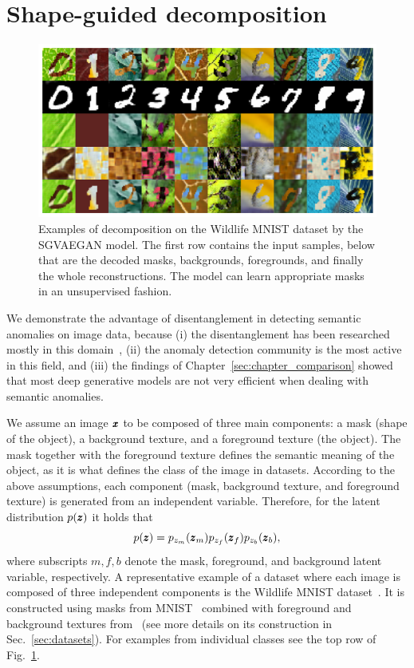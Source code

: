 \section{Shape-guided decomposition} \label{sec:model}
\begin{figure}[ht!]
    \centering
    \includegraphics[width=\textwidth]{data/chapter_sgvaegan/fig1_wmnist_grid.png}
    \caption{Examples of decomposition on the Wildlife MNIST dataset by the SGVAEGAN model. The first row contains the input samples, below that are the decoded masks, backgrounds, foregrounds, and finally the whole reconstructions. The model can learn appropriate masks in an unsupervised fashion.}
    \label{fig:wmnist_grid}
\end{figure}

We demonstrate the advantage of disentanglement in detecting semantic anomalies on image data, because (i) the disentanglement has been researched mostly in this domain~\cite{kim2018disentangling, kim2019bayes, choi2020discond}, (ii) the anomaly detection community is the most active in this field, and (iii) the findings of Chapter~\ref{sec:chapter_comparison} showed that most deep generative models are not very efficient when dealing with semantic anomalies.

We assume an image $\pmb{{x}}$ to be composed of three main components: a mask (shape of the object), a background texture, and a foreground texture (the object). The mask together with the foreground texture defines the semantic meaning of the object, as it is what defines the class of the image in datasets. According to the above assumptions, each component (mask, background texture, and foreground texture) is generated from an independent variable. Therefore, for the latent distribution $p(\pmb{{z}})$ it holds that
\begin{equation} \label{eq:latent_decomposition}
     p(\pmb{{z}}) = p_{z_{m}}(\pmb{{z}}_{m})p_{z_{f}}(\pmb{{z}}_{f})p_{z_b}(\pmb{{z}}_{b}),
\end{equation}
where subscripts $m,f,b$ denote the mask, foreground, and background latent variable, respectively. 
A representative example of a dataset where each image is composed of three independent components is the Wildlife MNIST dataset~\cite{sauer2021counterfactual}. It is constructed using masks from MNIST~\cite{lecun2010mnist} combined with foreground and background textures from~\cite{cimpoi2014describing} (see more details on its construction in Sec.~\ref{sec:datasets}). For examples from individual classes see the top row of Fig.~\ref{fig:wmnist_grid}. 

